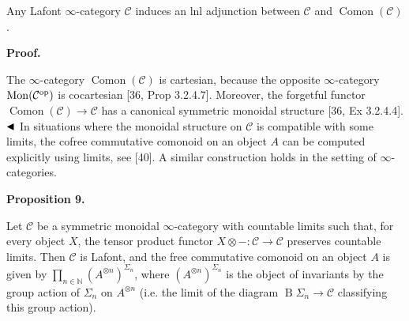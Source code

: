 \documentclass[10pt,a4paper]{article}
\begin{document}
 
Any Lafont $\infty$-category ${\mathcal{C}}$ induces an lnl adjunction between ${\mathcal{C}}$ and $\operatorname{Comon}({\mathcal{C}})$.\par
 
 
 
 
\par\medskip\noindent\textbf{Proof.}\par
 
 
The $\infty$-category $\operatorname{Comon}({\mathcal{C}})$ is cartesian, because the opposite $\infty$-category $\operatorname{Mon}({\mathcal{C}}^{\textnormal{op}})$ is cocartesian [36, Prop 3.2.4.7]. Moreover, the forgetful functor $\operatorname{Comon}({\mathcal{C}})\to{\mathcal{C}}$ has a canonical symmetric monoidal structure [36, Ex 3.2.4.4]. $\hfill\blacktriangleleft$ In situations where the monoidal structure on ${\mathcal{C}}$ is compatible with some limits, the cofree commutative comonoid on an object $A$ can be computed explicitly using limits, see [40]. A similar construction holds in the setting of $\infty$-categories.\par
 
 
 
\par\medskip\noindent\textbf{Proposition 9.}\par
 
 
Let ${\mathcal{C}}$ be a symmetric monoidal $\infty$-category with countable limits such that, for every object $X$, the tensor product functor $X\otimes-:{\mathcal{C}}\to{\mathcal{C}}$ preserves countable limits. Then ${\mathcal{C}}$ is Lafont, and the free commutative comonoid on an object $A$ is given by $\prod_{n\in\mathbb{N}}(A^{\otimes n})^{\Sigma_{n}}$, where $(A^{\otimes n})^{\Sigma_{n}}$ is the object of invariants by the group action of $\Sigma_{n}$ on $A^{\otimes n}$ (i.e. the limit of the diagram $\operatorname{B}\Sigma_{n}\to{\mathcal{C}}$ classifying this group action).\par
 
 
 
\end{document}

